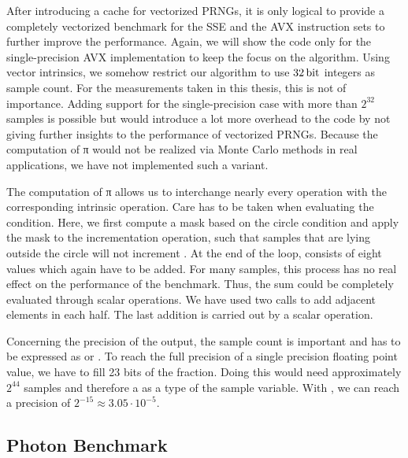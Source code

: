 \documentclass{stdlocal}
\begin{document}
    After introducing a cache for vectorized PRNGs, it is only logical to provide a completely vectorized benchmark for the SSE and the AVX instruction sets to further improve the performance.
    Again, we will show the code only for the single-precision AVX implementation to keep the focus on the algorithm.
    Using vector intrinsics, we somehow restrict our algorithm to use $32\, \mathrm{bit}$ integers as sample count.
    For the measurements taken in this thesis, this is not of importance.
    Adding support for the single-precision case with more than $2^{32}$ samples is possible but would introduce a lot more overhead to the code by not giving further insights to the performance of vectorized PRNGs.
    Because the computation of π would not be realized via Monte Carlo methods in real applications, we have not implemented such a variant.

    The computation of π allows us to interchange nearly every operation with the corresponding intrinsic operation.
    Care has to be taken when evaluating the condition.
    Here, we first compute a mask based on the circle condition and apply the mask to the incrementation operation, such that samples that are lying outside the circle will not increment .
    At the end of the  loop,  consists of eight values which again have to be added.
    For many samples, this process has no real effect on the performance of the benchmark.
    Thus, the sum could be completely evaluated through scalar operations.
    We have used two  calls to add adjacent elements in each half.
    The last addition is carried out by a scalar operation.

    Concerning the precision of the output, the sample count is important and has to be expressed as  or .
    To reach the full precision of a single precision floating point value, we have to fill 23 bits of the fraction.
    Doing this would need approximately $2^{44}$ samples and therefore a  as a type of the sample variable.
    With , we can reach a precision of $2^{-15} \approx 3.05\cdot 10^{-5}$.

  \subsection{Photon Benchmark} %
  \label{sub:photon_benchmark}

\end{document}
